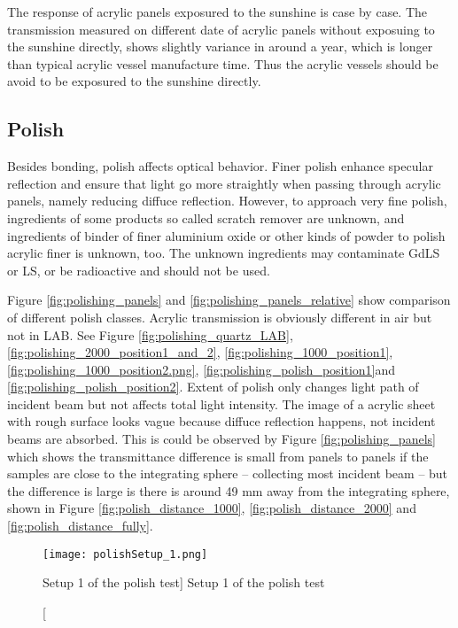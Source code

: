 

The response of acrylic panels exposured to the sunshine is case by case.
The transmission measured on different date of acrylic panels without exposuing to the sunshine directly,
shows slightly variance in around a year, which is longer than typical acrylic vessel manufacture time.
Thus the acrylic vessels should be avoid to be exposured to the sunshine directly.


\subsection {Polish}
\label{sec:Polish}

Besides bonding, polish affects optical behavior.
Finer polish enhance specular reflection and ensure that light
go more straightly when passing through acrylic panels, namely
reducing diffuce reflection. However, to approach very fine polish,
ingredients of some products so called scratch remover are unknown, and
ingredients of binder of finer aluminium oxide or other kinds of powder to polish
acrylic finer is unknown, too. The unknown ingredients may contaminate GdLS or LS, or
be radioactive and should not be used.

Figure \ref{fig:polishing_panels} and \ref{fig:polishing_panels_relative} show comparison of different polish classes.
Acrylic transmission is obviously different in air but not in LAB. See Figure \ref{fig:polishing_quartz_LAB}, \ref{fig:polishing_2000_position1_and_2},
\ref{fig:polishing_1000_position1}, \ref{fig:polishing_1000_position2.png}, \ref{fig:polishing_polish_position1}and \ref{fig:polishing_polish_position2}.
Extent of polish only changes light path of incident beam but not affects total light intensity.
The image of a acrylic sheet with rough surface looks vague because diffuce reflection happens, not
incident beams are absorbed. This is could be observed by Figure \ref{fig:polishing_panels} which shows the transmittance difference
is small from panels to panels if the samples are close to the integrating sphere -- collecting most incident beam -- but the difference is large
is there is around 49 mm away from the integrating sphere,
shown in Figure \ref{fig:polish_distance_1000}, \ref{fig:polish_distance_2000} and \ref{fig:polish_distance_fully}.

\begin{figure}
    \label{fig:polishSetup_1}
    \centering
    \texttt{[image: polishSetup\_1.png]}
    \caption
    [Setup 1 of the polish test]
    {Setup 1 of the polish test}
    \end{figure}


